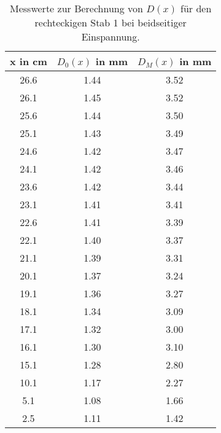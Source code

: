 \begin{table}
  \centering
  \begin{tabular}{c c c}
    \toprule
    x in \si{\centi\meter} & $D_0(x)$ in \si{\milli\meter} & $D_M(x)$ in \si{\milli\meter} \\
    \midrule
    26.6 & 1.44 & 3.52 \\
    26.1 & 1.45 & 3.52 \\
    25.6 & 1.44 & 3.50 \\
    25.1 & 1.43 & 3.49 \\
    24.6 & 1.42 & 3.47 \\
    24.1 & 1.42 & 3.46 \\
    23.6 & 1.42 & 3.44 \\
    23.1 & 1.41 & 3.41 \\
    22.6 & 1.41 & 3.39 \\
    22.1 & 1.40 & 3.37 \\
    21.1 & 1.39 & 3.31 \\
    20.1 & 1.37 & 3.24 \\
    19.1 & 1.36 & 3.27 \\
    18.1 & 1.34 & 3.09 \\
    17.1 & 1.32 & 3.00 \\
    16.1 & 1.30 & 3.10 \\
    15.1 & 1.28 & 2.80 \\
    10.1 & 1.17 & 2.27 \\
    5.1  & 1.08 & 1.66 \\
    2.5  & 1.11 & 1.42 \\
    \bottomrule
  \end{tabular}
  \caption{Messwerte zur Berechnung von $D(x)$ für den rechteckigen Stab 1 bei
  beidseitiger Einspannung.}
  \label{tab:messung3a}
\end{table}

